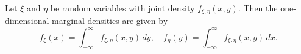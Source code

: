 Let $\xi$ and $\eta$ be random variables with joint density $f_{\xi,\eta}(x,y)$. Then the one-dimensional marginal densities are given by
$$f_{\xi}(x) = \int_{-\infty}^{\infty} f_{\xi,\eta}(x,y) \, dy, \quad f_{\eta}(y) = \int_{-\infty}^{\infty} f_{\xi,\eta}(x,y) \, dx.$$
